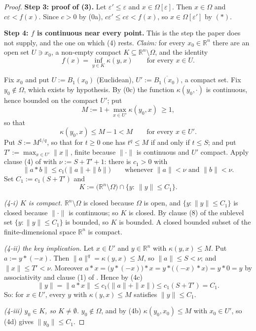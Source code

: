 \begin{proof}
\medskip\noindent\textbf{Step 3: proof of (3).} Let $\varepsilon'\le\varepsilon$ and
$x\in\Omega[\varepsilon]$. Then $x\in\Omega$ and $c\varepsilon<f(x)$. Since $c>0$ by (0a),
$c\varepsilon'\le c\varepsilon<f(x)$, so $x\in\Omega[\varepsilon']$ by $(\ast)$.

\medskip\noindent\textbf{Step 4: $f$ is continuous near every point.} This is the step the
paper does not supply, and the one on which (4) rests. \emph{Claim:} for every
$x_0\in\mathbb R^{n}$ there are an open set $U\ni x_0$, a non-empty compact
$K\subseteq\mathbb R^{n}\setminus\Omega$, and the identity
\[
 f(x)=\inf_{y\in K}\kappa(y,x)\qquad\text{for every }x\in U. \tag{4a}
\]

Fix $x_0$ and put $U:=B_1(x_0)$ (Euclidean), $U':=\overline{B_1(x_0)}$, a compact set. Fix
$y_0\notin\Omega$, which exists by hypothesis. By (0c) the function $\kappa(y_0,\cdot)$ is
continuous, hence bounded on the compact $U'$; put
\[
 M:=1+\max_{x\in U'}\kappa(y_0,x)\ \ge1 ,
\]
so that
\[
 \kappa(y_0,x)\le M-1<M\qquad\text{for every }x\in U'. \tag{4b}
\]
Put $S:=M^{1/q}$, so that for $t\ge0$ one has $t^{q}\le M$ if and only if $t\le S$; and put
$T':=\max_{x\in U'}\|x\|$, finite because $\|\cdot\|$ is continuous and $U'$ compact. Apply
clause (4) of  with $\nu:=S+T'+1$: there is $c_1>0$ with
\[
 \|a*b\|\le c_1\big(\|a\|+\|b\|\big)\qquad\text{whenever }\|a\|<\nu\text{ and }\|b\|<\nu. \tag{4c}
\]
Set $C_1:=c_1(S+T')$ and
\[
 K:=\big(\mathbb R^{n}\setminus\Omega\big)\cap\big\{y:\ \|y\|\le C_1\big\}.
\]

\emph{(4-i) $K$ is compact.} $\mathbb R^{n}\setminus\Omega$ is closed because $\Omega$ is
open, and $\{y:\|y\|\le C_1\}$ is closed because $\|\cdot\|$ is continuous; so $K$ is
closed. By clause (8) of  the sublevel set $\{y:\|y\|\le C_1\}$ is
bounded, so $K$ is bounded. A closed bounded subset of the finite-dimensional space
$\mathbb R^{n}$ is compact.

\emph{(4-ii) the key implication.} Let $x\in U'$ and $y\in\mathbb R^{n}$ with
$\kappa(y,x)\le M$. Put $a:=y*(-x)$. Then $\|a\|^{q}=\kappa(y,x)\le M$, so $\|a\|\le S<\nu$;
and $\|x\|\le T'<\nu$. Moreover $a*x=\big(y*(-x)\big)*x=y*\big((-x)*x\big)=y*0=y$ by
associativity and clause (1) of . Hence by (4c)
\[
 \|y\|=\|a*x\|\le c_1\big(\|a\|+\|x\|\big)\le c_1(S+T')=C_1 . \tag{4d}
\]
So: for $x\in U'$, every $y$ with $\kappa(y,x)\le M$ satisfies $\|y\|\le C_1$.

\emph{(4-iii) $y_0\in K$, so $K\ne\emptyset$.} $y_0\notin\Omega$, and by (4b)
$\kappa(y_0,x_0)\le M$ with $x_0\in U'$, so (4d) gives $\|y_0\|\le C_1$.


\end{proof}
